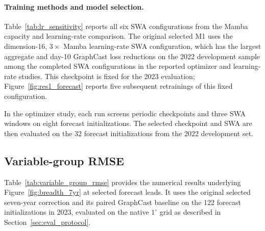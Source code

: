 \documentclass{article}
\newcommand{\vfourchange}[1]{{\color{blue}#1}}
\begin{document}
\paragraph{Training methods and model selection.}
Table~\ref{tab:lr_sensitivity} reports all six SWA configurations from the Mamba capacity and learning-rate comparison. \vfourchange{The original selected M1 uses} the dimension-16, $3\times$ Mamba learning-rate SWA configuration, which has the largest aggregate and day-10 {GraphCast loss} reductions \vfourchange{on the 2022 development sample} among the completed SWA configurations in the reported optimizer and learning-rate studies. \vfourchange{This checkpoint is fixed for the 2023 evaluation; Figure~\ref{fig:res1_forecast} reports five subsequent retrainings of this fixed configuration.}

In the optimizer study, each run screens periodic checkpoints and three SWA windows on eight forecast initializations. The selected checkpoint and SWA are then evaluated on the \vfourchange{32 forecast initializations from the 2022 development set}.

\subsection{Variable-group RMSE}
\label{app:variable_group_rmse}

Table~\ref{tab:variable_group_rmse} provides the numerical results underlying Figure~\ref{fig:breadth_7yr} at selected forecast leads. It uses the \vfourchange{original selected} seven-year correction and its paired GraphCast baseline on the \vfourchange{122 forecast initializations in 2023}, evaluated on the native $1^\circ$ grid as described in Section~\ref{sec:eval_protocol}.
\end{document}
